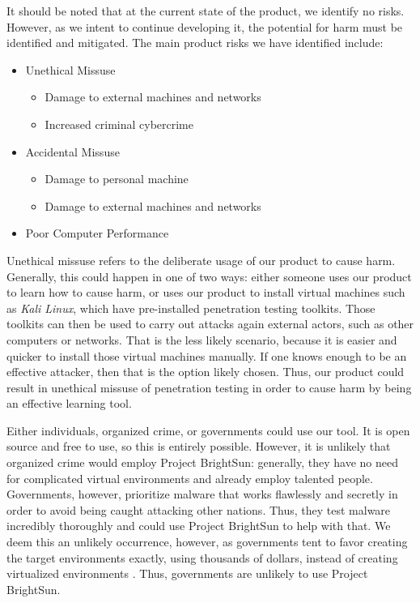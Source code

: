 \documentclass[openright]{report}
\begin{document}
\par It should be noted that at the current state of the product, we identify no risks. However, as we intent to continue developing it, the potential for harm must be identified and mitigated. The main product risks we have identified include: 
\begin{itemize}
    \item Unethical Missuse
        \begin{itemize}
            \item Damage to external machines and networks
            \item Increased criminal cybercrime
        \end{itemize}
    \item Accidental Missuse
        \begin{itemize}
            \item Damage to personal machine
            \item Damage to external machines and networks
        \end{itemize}
    \item Poor Computer Performance
\end{itemize}

\par Unethical missuse refers to the deliberate usage of our product to cause harm. Generally, this could happen in one of two ways: either someone uses our product to learn how to cause harm, or uses our product to install virtual machines such as \textit{Kali Linux}, which have pre-installed penetration testing toolkits. Those toolkits can then be used to carry out attacks again external actors, such as other computers or networks. That is the less likely scenario, because it is easier and quicker to install those virtual machines manually. If one knows enough to be an effective attacker, then that is the option likely chosen. Thus, our product could result in unethical missuse of penetration testing in order to cause harm by being an effective learning tool.

\par Either individuals, organized crime, or governments could use our tool. It is open source and free to use, so this is entirely possible. However, it is unlikely that organized crime would employ Project BrightSun: generally, they have no need for complicated virtual environments and already employ talented people. Governments, however, prioritize malware that works flawlessly and secretly in order to avoid being caught attacking other nations. Thus, they test malware incredibly thoroughly and could use Project BrightSun to help with that. We deem this an unlikely occurrence, however, as governments tent to favor creating the target environments exactly, using thousands of dollars, instead of creating virtualized environments \cite{countdown_0_day}. Thus, governments are unlikely to use Project BrightSun.
\end{document}
